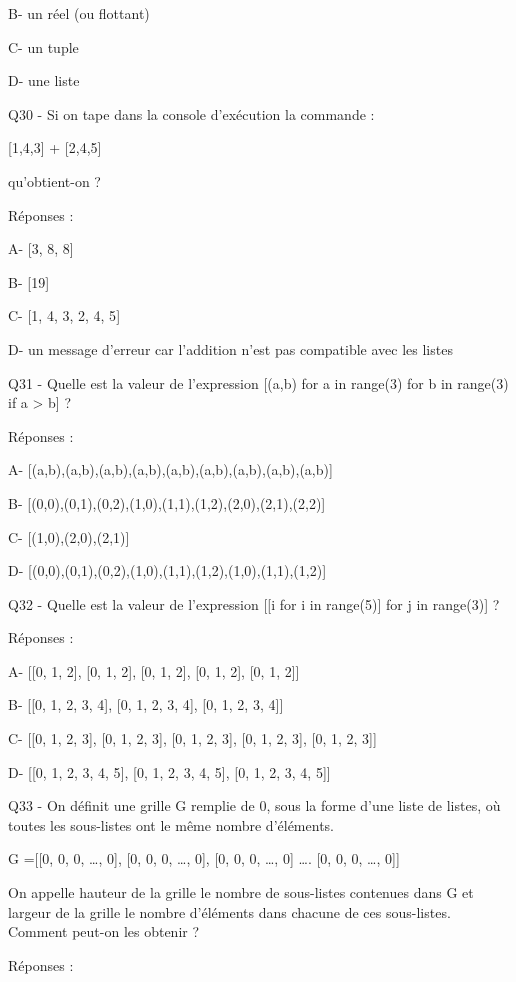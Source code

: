 \documentclass[
]{book}
\begin{document}
B- un réel (ou flottant)

C- un tuple

D- une liste

Q30 - Si on tape dans la console d'exécution la commande :

{[}1,4,3{]} + {[}2,4,5{]}

qu'obtient-on ?

Réponses :

A- {[}3, 8, 8{]}

B- {[}19{]}

C- {[}1, 4, 3, 2, 4, 5{]}

D- un message d'erreur car l'addition n'est pas compatible avec les listes

Q31 - Quelle est la valeur de l'expression {[}(a,b) for a in range(3) for b in range(3) if a \textgreater{} b{]} ?

Réponses :

A- {[}(a,b),(a,b),(a,b),(a,b),(a,b),(a,b),(a,b),(a,b),(a,b){]}

B- {[}(0,0),(0,1),(0,2),(1,0),(1,1),(1,2),(2,0),(2,1),(2,2){]}

C- {[}(1,0),(2,0),(2,1){]}

D- {[}(0,0),(0,1),(0,2),(1,0),(1,1),(1,2),(1,0),(1,1),(1,2){]}

Q32 - Quelle est la valeur de l'expression {[}{[}i for i in range(5){]} for j in range(3){]} ?

Réponses :

A- {[}{[}0, 1, 2{]}, {[}0, 1, 2{]}, {[}0, 1, 2{]}, {[}0, 1, 2{]}, {[}0, 1, 2{]}{]}

B- {[}{[}0, 1, 2, 3, 4{]}, {[}0, 1, 2, 3, 4{]}, {[}0, 1, 2, 3, 4{]}{]}

C- {[}{[}0, 1, 2, 3{]}, {[}0, 1, 2, 3{]}, {[}0, 1, 2, 3{]}, {[}0, 1, 2, 3{]}, {[}0, 1, 2, 3{]}{]}

D- {[}{[}0, 1, 2, 3, 4, 5{]}, {[}0, 1, 2, 3, 4, 5{]}, {[}0, 1, 2, 3, 4, 5{]}{]}

Q33 - On définit une grille G remplie de 0, sous la forme d'une liste de listes, où toutes les sous-listes ont le même nombre d'éléments.

G ={[}{[}0, 0, 0, \ldots, 0{]},
{[}0, 0, 0, \ldots, 0{]},
{[}0, 0, 0, \ldots, 0{]}
\ldots.
{[}0, 0, 0, \ldots, 0{]}{]}

On appelle hauteur de la grille le nombre de sous-listes contenues dans G et largeur de la grille le nombre d'éléments dans chacune de ces sous-listes. Comment peut-on les obtenir ?

Réponses :
\end{document}
